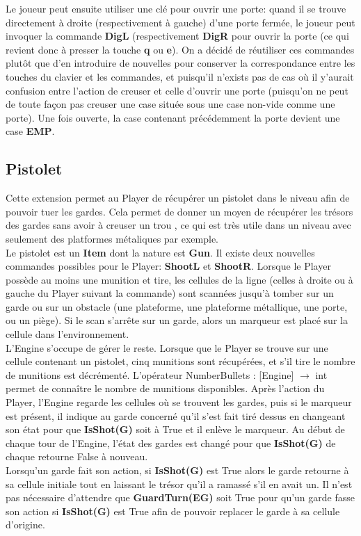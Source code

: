 \documentclass{article}
\begin{document}
Le joueur peut ensuite utiliser une clé pour ouvrir une porte: quand il se trouve directement à droite (respectivement à gauche) d'une porte fermée, le joueur peut invoquer la commande \textbf{DigL} (respectivement \textbf{DigR} pour ouvrir la porte (ce qui revient donc à presser la touche \textbf{q} ou \textbf{e}). On a décidé de réutiliser ces commandes plutôt que d'en introduire de nouvelles pour conserver la correspondance entre les touches du clavier et les commandes, et puisqu'il n'exists pas de cas où il y'aurait confusion entre l'action de creuser et celle d'ouvrir une porte (puisqu'on ne peut de toute façon pas creuser une case située sous une case non-vide comme une porte). Une fois ouverte, la case contenant précédemment la porte devient une case \textbf{EMP}.

\subsection{Pistolet}

Cette extension permet au Player de récupérer un pistolet dans le niveau afin de pouvoir tuer les gardes. Cela permet de donner un moyen de récupérer les trésors des gardes sans avoir à creuser un trou , ce qui est très utile dans un niveau avec seulement des platformes métaliques par exemple.\\

Le pistolet est un \textbf{Item} dont la nature est \textbf{Gun}. Il existe deux nouvelles commandes possibles pour le Player: \textbf{ShootL} et \textbf{ShootR}. Lorsque le Player possède au moins une munition et tire, les cellules de la ligne (celles à droite ou à gauche du Player suivant la commande) sont scannées jusqu'à tomber sur un garde ou sur un obstacle (une plateforme, une plateforme métallique, une porte, ou un piège). Si le scan s'arrête  sur un garde, alors un marqueur est placé sur la cellule dans l'environnement.\\

L'Engine s'occupe de gérer le reste. Lorsque que le Player se trouve sur une cellule contenant un pistolet, cinq munitions sont récupérées, et s'il tire le nombre de munitions est décrémenté. L'opérateur \textrm{NumberBullets : [Engine] $\rightarrow$ int} permet de connaître le nombre de munitions disponibles. Après l'action du Player, l'Engine regarde les cellules où se trouvent les gardes, puis si le marqueur est présent, il indique au garde concerné qu'il s'est fait tiré dessus en changeant son état pour que \textbf{IsShot(G)} soit à True et il enlève le marqueur. Au début de chaque tour de l'Engine, l'état des gardes est changé pour que \textbf{IsShot(G)} de chaque retourne False à nouveau.\\

Lorsqu'un garde fait son action, si \textbf{IsShot(G)} est True alors le garde retourne à sa cellule initiale tout en laissant le trésor qu'il a ramassé s'il en avait un. Il n'est pas nécessaire d'attendre que \textbf{GuardTurn(EG)} soit True pour qu'un garde fasse son action si \textbf{IsShot(G)} est True afin de pouvoir replacer le garde à sa cellule d'origine.
\end{document}
